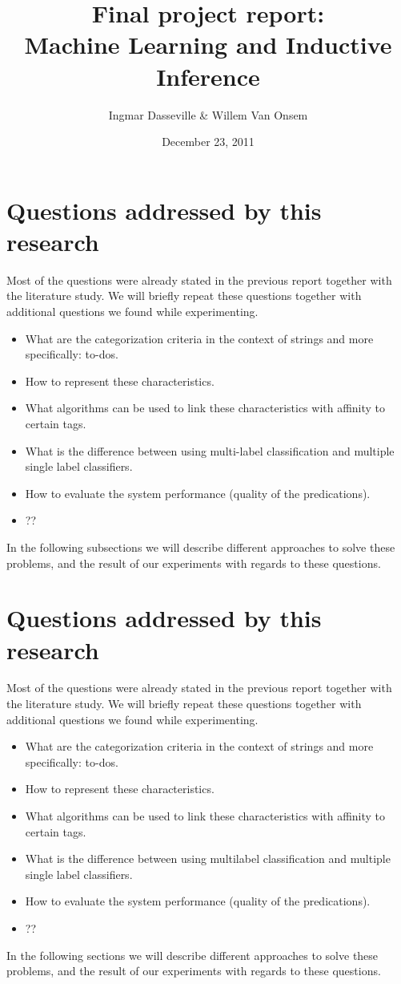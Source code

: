 \documentclass[a4paper,titlepage]{article}
\title{Final project report:\\Machine Learning and Inductive Inference}
\author{Ingmar Dasseville \& Willem Van Onsem}
\date{December 23, 2011}
\begin{document}
\begin{titlepage}
\maketitle
\end{titlepage}
\tableofcontents
\newpage
\section{Questions addressed by this research}
Most of the questions were already stated in the previous report together with the literature study. We will briefly repeat these questions together with additional questions we found while experimenting.
\begin{itemize}
 \item What are the categorization criteria in the context of strings and more specifically: to-dos.
 \item How to represent these characteristics.
 \item What algorithms can be used to link these characteristics with affinity to certain tags.
 \item What is the difference between using multi-label classification and multiple single label classifiers.
 \item How to evaluate the system performance (quality of the predications).
 \item ??
\end{itemize}
In the following subsections we will describe different approaches to solve these problems, and the result of our experiments with regards to these questions.
\section{Questions addressed by this research}
Most of the questions were already stated in the previous report together with the literature study. We will briefly repeat these questions together with additional questions we found while experimenting.
\begin{itemize}
 \item What are the categorization criteria in the context of strings and more specifically: to-dos.
 \item How to represent these characteristics.
 \item What algorithms can be used to link these characteristics with affinity to certain tags.
 \item What is the difference between using multilabel classification and multiple single label classifiers.
 \item How to evaluate the system performance (quality of the predications).
 \item ??
\end{itemize}
In the following sections we will describe different approaches to solve these problems, and the result of our experiments with regards to these questions.
\end{document}
